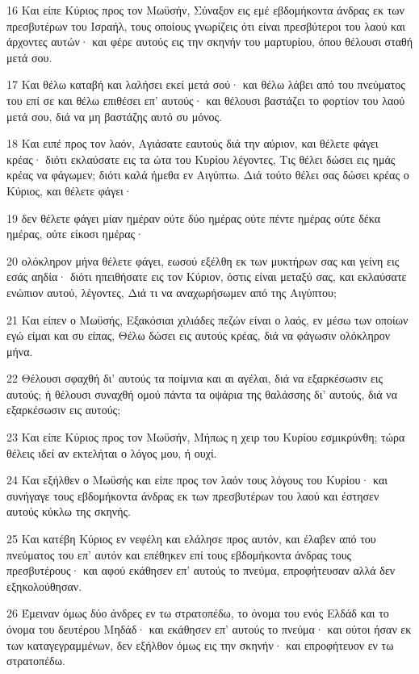 \par 16 Και είπε Κύριος προς τον Μωϋσήν, Σύναξον εις εμέ εβδομήκοντα άνδρας εκ των πρεσβυτέρων του Ισραήλ, τους οποίους γνωρίζεις ότι είναι πρεσβύτεροι του λαού και άρχοντες αυτών· και φέρε αυτούς εις την σκηνήν του μαρτυρίου, όπου θέλουσι σταθή μετά σου.
\par 17 Και θέλω καταβή και λαλήσει εκεί μετά σού· και θέλω λάβει από του πνεύματος του επί σε και θέλω επιθέσει επ' αυτούς· και θέλουσι βαστάζει το φορτίον του λαού μετά σου, διά να μη βαστάζης αυτό συ μόνος.
\par 18 Και ειπέ προς τον λαόν, Αγιάσατε εαυτούς διά την αύριον, και θέλετε φάγει κρέας· διότι εκλαύσατε εις τα ώτα του Κυρίου λέγοντες, Τις θέλει δώσει εις ημάς κρέας να φάγωμεν; διότι καλά ήμεθα εν Αιγύπτω. Διά τούτο θέλει σας δώσει κρέας ο Κύριος, και θέλετε φάγει·
\par 19 δεν θέλετε φάγει μίαν ημέραν ούτε δύο ημέρας ούτε πέντε ημέρας ούτε δέκα ημέρας, ούτε είκοσι ημέρας·
\par 20 ολόκληρον μήνα θέλετε φάγει, εωσού εξέλθη εκ των μυκτήρων σας και γείνη εις εσάς αηδία· διότι ηπειθήσατε εις τον Κύριον, όστις είναι μεταξύ σας, και εκλαύσατε ενώπιον αυτού, λέγοντες, Διά τι να αναχωρήσωμεν από της Αιγύπτου;
\par 21 Και είπεν ο Μωϋσής, Εξακόσιαι χιλιάδες πεζών είναι ο λαός, εν μέσω των οποίων εγώ είμαι και συ είπας, Θέλω δώσει εις αυτούς κρέας, διά να φάγωσιν ολόκληρον μήνα.
\par 22 Θέλουσι σφαχθή δι' αυτούς τα ποίμνια και αι αγέλαι, διά να εξαρκέσωσιν εις αυτούς; ή θέλουσι συναχθή ομού πάντα τα οψάρια της θαλάσσης δι' αυτούς, διά να εξαρκέσωσιν εις αυτούς;
\par 23 Και είπε Κύριος προς τον Μωϋσήν, Μήπως η χειρ του Κυρίου εσμικρύνθη; τώρα θέλεις ιδεί αν εκτελήται ο λόγος μου, ή ουχί.
\par 24 Και εξήλθεν ο Μωϋσής και είπε προς τον λαόν τους λόγους του Κυρίου· και συνήγαγε τους εβδομήκοντα άνδρας εκ των πρεσβυτέρων του λαού και έστησεν αυτούς κύκλω της σκηνής.
\par 25 Και κατέβη Κύριος εν νεφέλη και ελάλησε προς αυτόν, και έλαβεν από του πνεύματος του επ' αυτόν και επέθηκεν επί τους εβδομήκοντα άνδρας τους πρεσβυτέρους· και αφού εκάθησεν επ' αυτούς το πνεύμα, επροφήτευσαν αλλά δεν εξηκολούθησαν.
\par 26 Έμειναν όμως δύο άνδρες εν τω στρατοπέδω, το όνομα του ενός Ελδάδ και το όνομα του δευτέρου Μηδάδ· και εκάθησεν επ' αυτούς το πνεύμα· και ούτοι ήσαν εκ των καταγεγραμμένων, δεν εξήλθον όμως εις την σκηνήν· και επροφήτευον εν τω στρατοπέδω.
